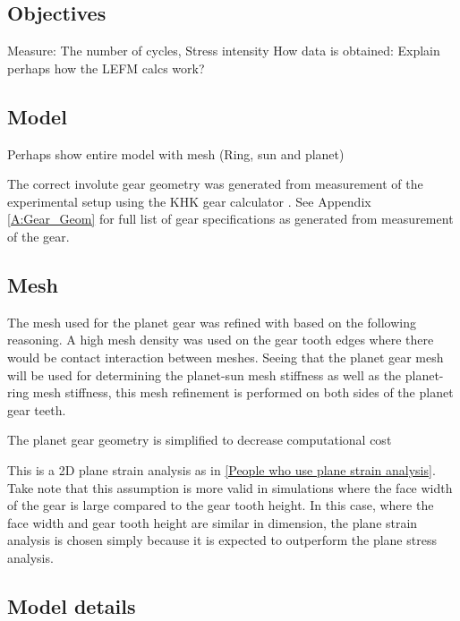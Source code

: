 \subsection{Objectives}
Measure: The number of cycles, Stress intensity
How data is obtained: Explain perhaps how the LEFM calcs work?

\subsection{Model}
Perhaps show entire model with mesh (Ring, sun and planet)

The correct involute gear geometry was generated from measurement of the experimental setup using the KHK gear calculator \cite{KHK2015}. See Appendix \ref{A:Gear_Geom} for full list of gear specifications as generated from measurement of the gear. 


\subsection{Mesh}
The mesh used for the planet gear was refined with based on the following reasoning. A high mesh density was used on the gear tooth edges where there would be contact interaction between meshes. Seeing that the planet gear mesh will be used for determining the planet-sun mesh stiffness as well as the planet-ring mesh stiffness, this mesh refinement is performed on both sides of the planet gear teeth. 

The planet gear geometry is simplified to decrease computational cost


This is a 2D plane strain analysis as in \ref{People who use plane strain analysis}. Take note that this assumption is more valid in simulations where the face width of the gear is large compared to the gear tooth height. In this case, where the face width and gear tooth height are similar in dimension, the plane strain analysis is chosen simply because it is expected to outperform the plane stress analysis. 

\subsection{Model details}

	\begin{table}[]
		\centering
	\end{table}


